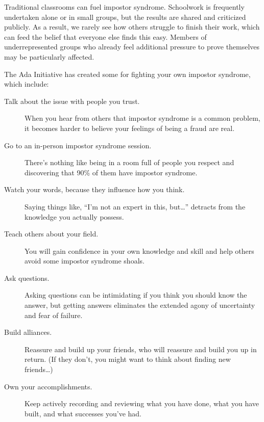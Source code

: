 Traditional classrooms can fuel impostor syndrome.
Schoolwork is frequently undertaken alone or in small groups,
but the results are shared and criticized publicly.
As a result,
we rarely see how others struggle to finish their work,
which can feed the belief that everyone else finds this easy.
Members of underrepresented groups who already feel additional pressure to prove themselves
may be particularly affected.

The Ada Initiative has created some 
for fighting your own impostor syndrome,
which include:

\begin{description}

\item[Talk about the issue with people you trust.]
  When you hear from others that impostor syndrome is a common problem,
  it becomes harder to believe your feelings of being a fraud are real.

\item[Go to an in-person impostor syndrome session.]
  There's nothing like being in a room full of people you respect
  and discovering that 90\% of them have impostor syndrome.

\item[Watch your words, because they influence how you think.]
  Saying things like,
  ``I'm not an expert in this, but{\ldots}''
  detracts from the knowledge you actually possess.

\item[Teach others about your field.]
  You will gain confidence in your own knowledge and skill
  and help others avoid some impostor syndrome shoals.

\item[Ask questions.]
  Asking questions can be intimidating if you think you should know the answer,
  but getting answers eliminates the extended agony of uncertainty and fear of failure.

\item[Build alliances.]
  Reassure and build up your friends,
  who will reassure and build you up in return.
  (If they don't, you might want to think about finding new friends{\ldots})

\item[Own your accomplishments.]
  Keep actively recording and reviewing what you have done,
  what you have built,
  and what successes you've had.

\end{description}

